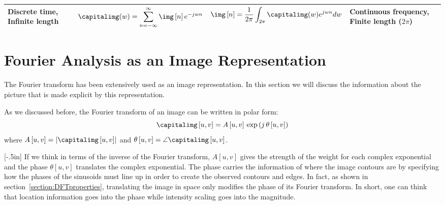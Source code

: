 \begin{table}[h]
\begin{center}
{\begin{tabular}{| p{2.1cm} | c | c | p{2.1cm} |}
				Discrete time, Infinite length                                                                                            &
				$\displaystyle \capitalimg (w) = \sum_{n=-\infty}^{\infty} \img \left[n \right] e^{- j w n}$
				                                                                                                                          &
				$\displaystyle \img \left[n \right] = \frac{1}{2\pi} \int_{2 \pi} \capitalimg (w) e^{j w n} d w$                          &
				Continuous frequency, Finite length ($2 \pi$)                                                                                                                 \\
				\hline
			\end{tabular}
		}
	\end{center}
	\label{table:tableFamilyFT}
\end{table}


\section{Fourier Analysis as an Image Representation}

The Fourier transform has been extensively used as an image representation. In this section we will discuss the information about the picture that is made explicit by this representation.


As we discussed before, the Fourier transform of an image can be written in polar form:
\begin{equation}
	\capitalimg \left[u,v \right]  = A \left[u,v \right] \, \exp{\left( j\, \theta\left[u,v \right]  \right)}
\end{equation}
where $A \left[u,v \right] = \left| \capitalimg \left[u,v \right]  \right|$ and $\theta \left[u,v \right] = \angle  \capitalimg \left[u,v \right]$.


[-.5in]
If we think in terms of the inverse of the Fourier transform, $A \left[u,v \right]$ gives the strength of the weight for each complex exponential and the phase $\theta \left[u,v \right]$ translates the complex exponential. The phase carries the information of where the image
contours are by specifying how the phases of the sinusoids must line up in order to create the observed contours and edges. In fact, as shown in section~\ref{section:DFTproperties}, translating the image in space only modifies the phase of its Fourier transform. In short, one can think that location information goes into the phase while intensity scaling goes into the magnitude.

